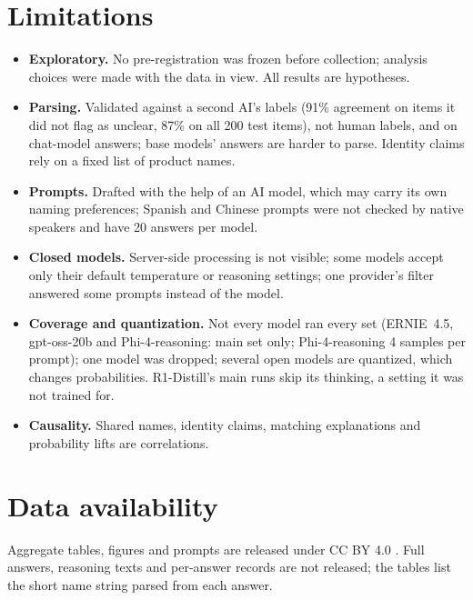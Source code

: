 \documentclass[11pt]{article}
\begin{document}
\section{Limitations}
\begin{itemize}
\item \textbf{Exploratory.} No pre-registration was frozen before collection; analysis choices were made with the data
in view. All results are hypotheses.
\item \textbf{Parsing.} Validated against a second AI's labels (91\% agreement on items it did not flag as unclear,
87\% on all 200 test items), not human labels, and on chat-model answers; base models' answers are harder to parse.
Identity claims rely on a fixed list of product names.
\item \textbf{Prompts.} Drafted with the help of an AI model, which may carry its own naming preferences; Spanish and
Chinese prompts were not checked by native speakers and have 20 answers per model.
\item \textbf{Closed models.} Server-side processing is not visible; some models accept only their default temperature
or reasoning settings; one provider's filter answered some prompts instead of the model.
\item \textbf{Coverage and quantization.} Not every model ran every set (ERNIE~4.5, gpt-oss-20b and Phi-4-reasoning:
main set only; Phi-4-reasoning 4 samples per prompt); one model was dropped; several open models are quantized,
which changes probabilities. R1-Distill's main runs skip its thinking, a setting it was not trained for.
\item \textbf{Causality.} Shared names, identity claims, matching explanations and probability lifts are correlations.
\end{itemize}

\section*{Data availability}
Aggregate tables, figures and prompts are released under CC BY 4.0 \citep{model_identity_data_2026}. Full answers,
reasoning texts and per-answer records are not released; the tables list the short name string parsed from each answer.

\clearpage


\end{document}

